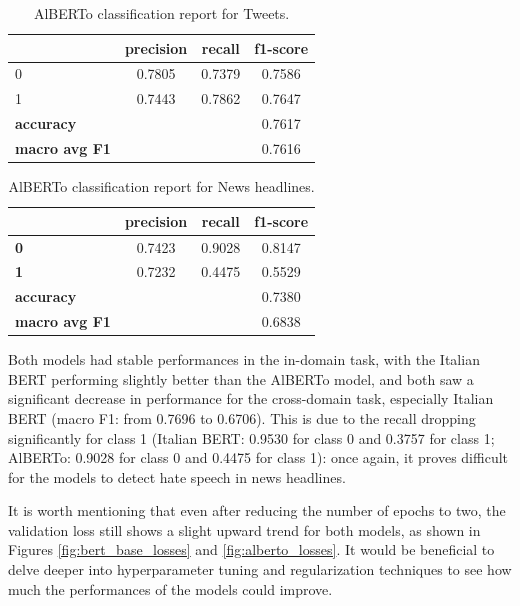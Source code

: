 \begin{table}[h]
    \centering
    \small
    \begin{tabular}{lccc}
        \toprule
        & \textbf{precision} & \textbf{recall} & \textbf{f1-score} \\
        \midrule
        0 & 0.7805 & 0.7379 & 0.7586 \\
        1 & 0.7443 & 0.7862 & 0.7647 \\
        \midrule
        \textbf{accuracy} & & & 0.7617 \\
        \textbf{macro avg F1} & & & 0.7616 \\
        \bottomrule
    \end{tabular}
    \caption{AlBERTo classification report for Tweets.}
    \label{tab:classification_report_alberto_tweets}
\end{table}

\begin{table}[h]
    \centering
    \small
    \begin{tabular}{lccc}
        \toprule
     & \textbf{precision} & \textbf{recall} & \textbf{f1-score} \\
        \midrule
        \textbf{0}          & 0.7423  & 0.9028 & 0.8147  \\
        \textbf{1}          & 0.7232  & 0.4475 & 0.5529  \\
        \midrule
        \textbf{accuracy}   &         &        & 0.7380  \\
        \textbf{macro avg F1}  &   &  & 0.6838  \\
        \bottomrule
    \end{tabular}
    \caption{AlBERTo classification report for News headlines.}
    \label{tab:classification_report_alberto_news}
\end{table}

Both models had stable performances in the in-domain task, with the Italian BERT performing slightly better than the AlBERTo model, and both saw a significant decrease in performance for the cross-domain task, especially Italian BERT (macro F1: from 0.7696 to 0.6706). This is due to the recall dropping significantly for class 1 (Italian BERT: 0.9530 for class 0 and 0.3757 for class 1; AlBERTo: 0.9028 for class 0 and 0.4475 for class 1): once again, it proves difficult for the models to detect hate speech in news headlines.

It is worth mentioning that even after reducing the number of epochs to two, the validation loss still shows a slight upward trend for both models, as shown in Figures \ref{fig:bert_base_losses} and \ref{fig:alberto_losses}. It would be beneficial to delve deeper into hyperparameter tuning and regularization techniques to see how much the performances of the models could improve.

